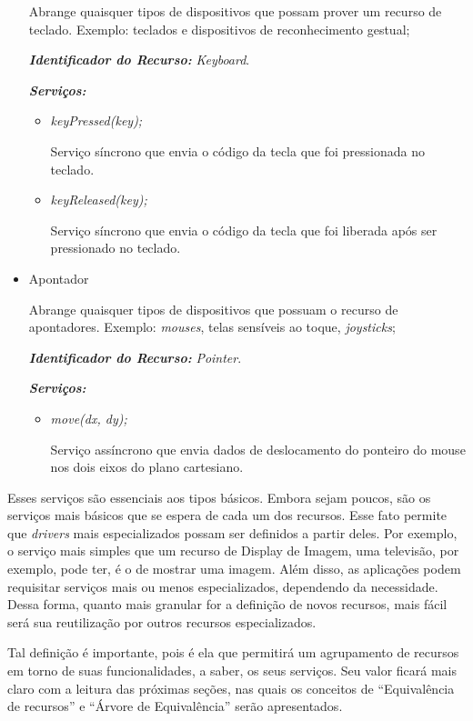 \begin{itemize}
		Abrange quaisquer tipos de dispositivos que possam prover um recurso de teclado. Exemplo: teclados e dispositivos de reconhecimento gestual;

		\emph{\bf{Identificador do Recurso:}} \emph{Keyboard}.

		\emph{\bf{Serviços:}} 
		\begin{itemize}
			\item \emph{keyPressed(key);}

				Serviço síncrono que envia o código da tecla que foi pressionada no teclado.

			\item \emph{keyReleased(key);}

				Serviço síncrono que envia o código da tecla que foi liberada após ser pressionado no teclado.
		\end{itemize}

	\item Apontador
		
		Abrange quaisquer tipos de dispositivos que possuam o recurso de apontadores. Exemplo: \emph{mouses}, telas sensíveis ao toque, \emph{joysticks};

		\emph{\bf{Identificador do Recurso:}} \emph{Pointer}.

		\emph{\bf{Serviços:}} 
		\begin{itemize}
			\item \emph{move(dx, dy);}

				Serviço assíncrono que envia dados de deslocamento do ponteiro do mouse nos dois eixos do plano cartesiano.
		\end{itemize}

\end{itemize}

Esses serviços são essenciais aos tipos básicos. Embora sejam poucos, são os serviços mais básicos que se espera de cada um dos recursos.
Esse fato permite que \emph{drivers} mais especializados possam ser definidos a partir deles. Por exemplo, o serviço mais simples que um recurso de Display de Imagem, uma televisão, por exemplo, pode ter, é o de mostrar uma imagem. Além disso, as aplicações podem requisitar serviços mais ou menos especializados, dependendo da necessidade. Dessa forma, quanto mais granular for a definição de novos recursos, mais fácil será sua reutilização por outros recursos especializados. 

Tal definição é importante, pois é ela que permitirá um agrupamento de recursos em torno de suas funcionalidades, a saber, os seus serviços. Seu valor ficará mais claro com a leitura das próximas seções, nas quais os conceitos de ``Equivalência de recursos'' e ``Árvore de Equivalência'' serão apresentados.

